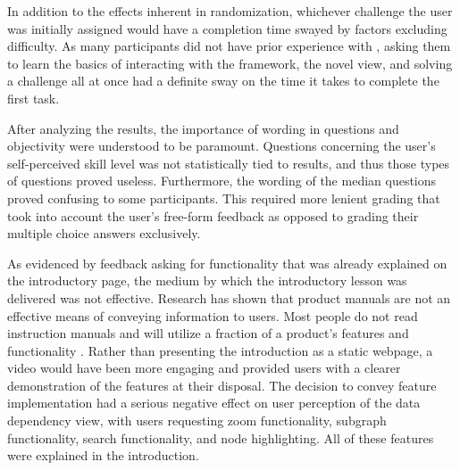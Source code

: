 In addition to the effects inherent in randomization, whichever challenge the user was initially assigned would have a completion time swayed by factors excluding difficulty. As many participants did not have prior experience with , asking them to learn the basics of interacting with the framework, the novel view, and solving a challenge all at once had a definite sway on the time it takes to complete the first task. 

After analyzing the results, the importance of wording in questions and objectivity were understood to be paramount. Questions concerning the user's self-perceived skill level was not statistically tied to results, and thus those types of questions proved useless. Furthermore, the wording of the median questions proved confusing to some participants. This required more lenient grading that took into account the user's free-form feedback as opposed to grading their multiple choice answers exclusively. 

As evidenced by feedback asking for functionality that was already explained on the introductory page, the medium by which the introductory lesson was delivered was not effective. Research has shown that product manuals are not an effective means of conveying information to users. Most people do not read instruction manuals and will utilize a fraction of a product's features and functionality \citep{blackler2016life}. Rather than presenting the introduction as a static webpage, a video would have been more engaging and provided users with a clearer demonstration of the features at their disposal. The decision to convey feature implementation had a serious negative effect on user perception of the data dependency view, with users requesting zoom functionality, subgraph functionality, search functionality, and node highlighting. All of these features were explained in the introduction. 

